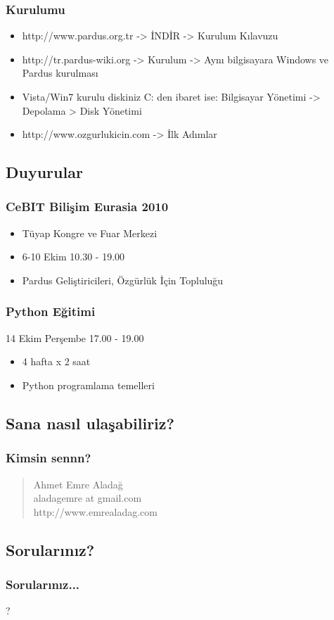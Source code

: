 \documentclass{beamer}
\begin{document}
	\begin{frame}
	 \frametitle{Kurulumu}
		\begin{itemize}
		 \item http://www.pardus.org.tr -> İNDİR -> Kurulum Kılavuzu
		 \item http://tr.pardus-wiki.org -> Kurulum -> Aynı bilgisayara Windows ve Pardus kurulması
		 \item Vista/Win7 kurulu diskiniz C: den ibaret ise: Bilgisayar Yönetimi -> Depolama > Disk Yönetimi
		 \item http://www.ozgurlukicin.com -> İlk Adımlar
		\end{itemize}

	\end{frame}


	\subsection{Duyurular}
	\begin{frame}
	 \frametitle{CeBIT Bilişim Eurasia 2010}
			\begin{itemize}
				\item Tüyap Kongre ve Fuar Merkezi
				\item 6-10 Ekim 10.30 - 19.00
				\item Pardus Geliştiricileri, Özgürlük İçin Topluluğu
			\end{itemize}
	\end{frame}

	\begin{frame}
	 \frametitle{Python Eğitimi}
			14 Ekim Perşembe 17.00 - 19.00
			\begin{itemize}
				\item 4 hafta x 2 saat
				\item Python programlama temelleri
			\end{itemize}
	\end{frame}

	\subsection{Sana nasıl ulaşabiliriz?}
	\begin{frame}
	 	\frametitle{Kimsin sennn?}
		\begin{quote}
 			Ahmet Emre Aladağ \\ aladagemre at gmail.com \\ http://www.emrealadag.com\\
		\end{quote}
	\end{frame}

	\subsection{Sorularınız?}
	\begin{frame}
	 	\frametitle{Sorularınız...}
		\begin{center}
		 ?
		\end{center}
		
	\end{frame}
\end{document}

